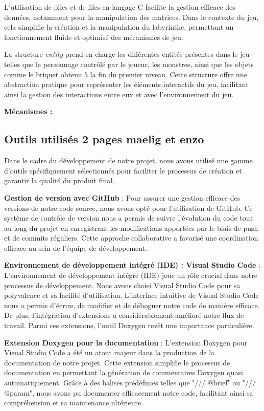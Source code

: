 \documentclass[10pt]{article}
\begin{document}
L'utilisation de piles et de files en langage C facilite la gestion efficace des données, notamment pour la manipulation des matrices. Dans le contexte du jeu, cela simplifie la création et la manipulation du labyrinthe, permettant un fonctionnement fluide et optimisé des mécanismes de jeu.

La structure \textit{entity} prend en charge les différentes entités présentes dans le jeu telles que le personnage contrôlé par le joueur, les monstres, ainsi que les objets comme le briquet obtenu à la fin du premier niveau. Cette structure offre une abstraction pratique pour représenter les éléments interactifs du jeu, facilitant ainsi la gestion des interactions entre eux et avec l'environnement du jeu.


   \textbf{Mécanismes :}\\
   \subsection{Outils utilisés 2 pages maelig et enzo}
   Dans le cadre du développement de notre projet, nous avons utilisé une gamme d'outils spécifiquement sélectionnés pour faciliter le processus de création et garantir la qualité du produit final.

\textbf{Gestion de version avec GitHub} :
Pour assurer une gestion efficace des versions de notre code source, nous avons opté pour l'utilisation de GitHub. Ce système de contrôle de version nous a permis de suivre l'évolution du code tout au long du projet en enregistrant les modifications apportées par le biais de push et de commits réguliers. Cette approche collaborative a favorisé une coordination efficace au sein de l'équipe de développement.

\textbf{Environnement de développement intégré (IDE) : Visual Studio Code} :
L'environnement de développement intégré (IDE) joue un rôle crucial dans notre processus de développement. Nous avons choisi Visual Studio Code pour sa polyvalence et sa facilité d'utilisation. L'interface intuitive de Visual Studio Code nous a permis d'écrire, de modifier et de déboguer notre code de manière efficace. De plus, l'intégration d'extensions a considérablement amélioré notre flux de travail. Parmi ces extensions, l'outil Doxygen revêt une importance particulière.

\textbf{Extension Doxygen pour la documentation} :
L'extension Doxygen pour Visual Studio Code a été un atout majeur dans la production de la documentation de notre projet. Cette extension simplifie le processus de documentation en permettant la génération de commentaires Doxygen quasi automatiquement. Grâce à des balises prédéfinies telles que "/// @brief" ou "/// @param", nous avons pu documenter efficacement notre code, facilitant ainsi sa compréhension et sa maintenance ultérieure.
\end{document}
